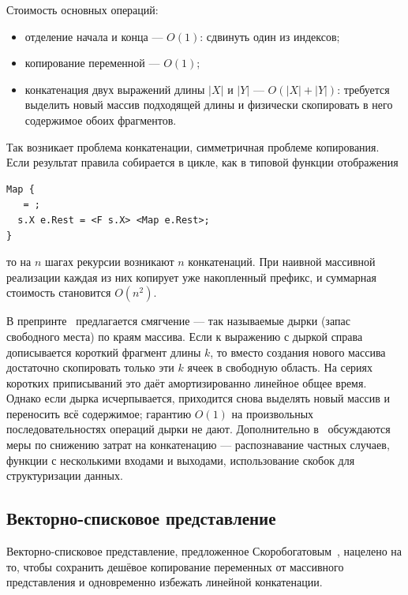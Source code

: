 Стоимость основных операций:

\begin{itemize}
  \item отделение начала и конца --- \(O(1)\): сдвинуть один из индексов;
  \item копирование переменной --- \(O(1)\);
  \item конкатенация двух выражений длины \(|X|\) и \(|Y|\) ---
        \(O(|X| + |Y|)\): требуется выделить новый массив подходящей
        длины и физически скопировать в него содержимое обоих фрагментов.
\end{itemize}

Так возникает проблема конкатенации, симметричная проблеме
копирования. Если результат правила собирается в цикле, как в типовой
функции отображения

\begin{lstlisting}[language=Refal,caption={Построение результата через рекурсивную конкатенацию},label={lst:map}]
Map {
   = ;
  s.X e.Rest = <F s.X> <Map e.Rest>;
}
\end{lstlisting}

то на \(n\) шагах рекурсии возникают \(n\) конкатенаций. При наивной
массивной реализации каждая из них копирует уже накопленный префикс, и
суммарная стоимость становится \(O(n^2)\).

В препринте~\cite{abramov_romanenko_1988} предлагается смягчение --- так
называемые дырки (запас свободного места) по краям массива. Если
к выражению с дыркой справа дописывается короткий фрагмент длины \(k\),
то вместо создания нового массива достаточно скопировать только эти \(k\)
ячеек в свободную область. На сериях коротких приписываний это даёт
амортизированно линейное общее время. Однако если дырка исчерпывается,
приходится снова выделять новый массив и переносить всё содержимое;
гарантию \(O(1)\) на произвольных последовательностях операций дырки не
дают. Дополнительно в~\cite{abramov_romanenko_1988} обсуждаются меры по
снижению затрат на конкатенацию --- распознавание частных случаев,
функции с несколькими входами и выходами, использование скобок для
структуризации данных.

\subsection{Векторно-списковое представление}
\label{sec:vector-list}

Векторно-списковое представление, предложенное
Скоробогатовым~\cite{skorobogatov_repr}, нацелено на то, чтобы сохранить
дешёвое копирование переменных от массивного представления и одновременно
избежать линейной конкатенации.

